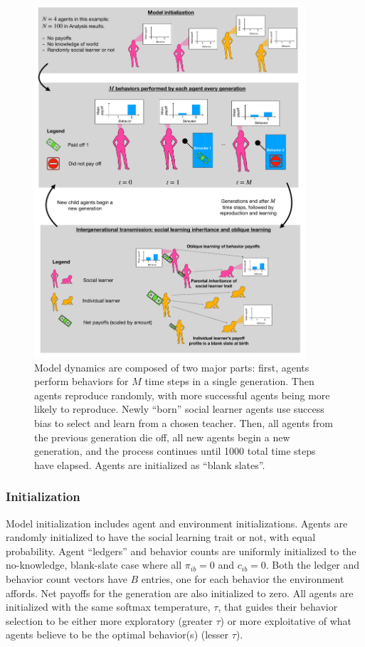 \documentclass[letterpaper,11.5pt]{scrartcl}
\begin{document}
\begin{figure}
  \caption{Model dynamics are composed of two major parts: first, agents perform
  behaviors for $M$ time steps in a single generation. Then agents reproduce
  randomly, with more successful agents being more likely to reproduce. Newly
  ``born'' social learner agents use success bias to select and learn from a chosen
  teacher. Then, all agents from the previous generation die off, all new agents
  begin a new generation, and the process continues until 1000 total time steps
  have elapsed. Agents are initialized as ``blank slates''.}
  \label{fig:IntraInterGenerationalDynamics}
  \centering
    \includegraphics[width=0.9\textwidth]{Figures/IntraInterGenerationalDynamics.pdf}
\end{figure}


\subsubsection{Initialization}

Model initialization includes agent and environment initializations. Agents are
randomly initialized to have the social learning trait or not, with equal 
probability. Agent ``ledgers'' and behavior counts 
are uniformly initialized to the no-knowledge,
blank-slate case where all $\pi_{ib} = 0$ and $c_{ib} = 0$. Both the 
ledger and behavior count vectors have $B$ entries, one for each
behavior the environment affords. Net payoffs for
the generation are also initialized to zero. All agents are initialized with
the same softmax temperature, $\tau$, that guides their behavior selection 
to be either more exploratory (greater $\tau$) or more exploitative of
what agents believe to be the optimal behavior(s) (lesser $\tau$).
\end{document}
